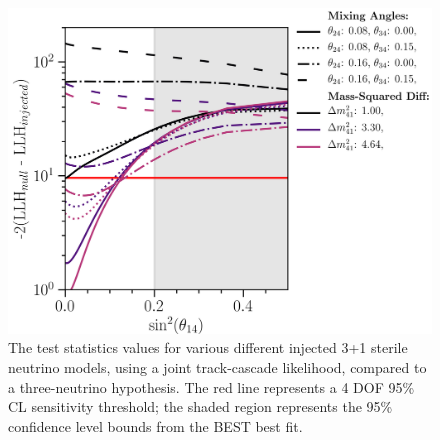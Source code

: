 \documentclass[main.tex]{subfiles}
\begin{document}
\begin{figure}
    \centering
    \includegraphics[width=0.99\linewidth]{figures/legendary.png}
    \caption{The test statistics values for various different injected 3+1 sterile neutrino models, using a joint track-cascade likelihood, compared to a three-neutrino hypothesis. The red line represents a 4 DOF 95\% CL sensitivity threshold; the shaded region represents the 95\% confidence level bounds from the BEST best fit.}\label{fig:bestsecond}
\end{figure}
\end{document}
